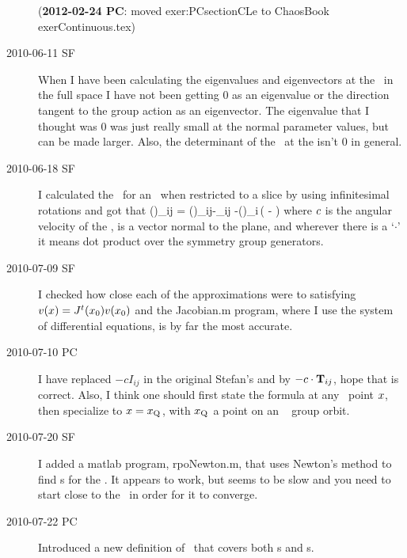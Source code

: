 \begin{description}
({\bf 2012-02-24 PC}: moved {exer:PCsectionCLe} to ChaosBook
exerContinuous.tex)

\item[2010-06-11 SF] When I have been calculating the eigenvalues and
eigenvectors at the \reqv\ in the full space I have not been getting 0 as
an eigenvalue or the direction tangent to the group action as an
eigenvector. The eigenvalue that I thought was 0 was just really small at
the normal parameter values, but can be made larger. Also, the
determinant of the \stabmat\ at the {\reqv} isn't 0 in general.

\item[2010-06-18 SF]
I calculated the \stabmat\ for an \reqv\ when restricted to a slice by
using infinitesimal rotations and got that
\beq
{\MvarRed}(\sspRed)_{ij} = \Mvar(\sspRed)_{ij}-\velRel \cdot \Lg_{ij}
     -\groupTan(\sspRed)_i\,\left(
     - \velRel {}
              \right)
where $c$ is the angular velocity of the \reqv, \sliceTan{} is a
vector normal to the plane, and wherever there is a `$\cdot$' it means
dot product over the symmetry group generators.

\item[2010-07-09 SF]
I checked how close each of the approximations were to satisfying
$v(x)=J^t({x_0}) v({x_0})$ and the Jacobian.m program, where I use the
system of differential equations, is by far the most accurate.

\item[2010-07-10 PC] I have replaced $-c I_{ij}$ in
the original Stefan's
 and  by
$-c \cdot \mathbf{T}_{ij}$, hope that is correct. Also,
I think one should first state the formula at any \statesp\
point $x$, then specialize to $x = x_{\mathrm{Q}_{}}$, with
$x_{\mathrm{Q}_{}}$ a point on an \reqv\ \REQB{} group orbit.


\item[2010-07-20 SF]
I added a matlab program, rpoNewton.m, that uses Newton's
method to find \rpo s for the \cLe. It appears to work, but
seems to be slow and you need to start close to the \rpo\ in
order for it to converge.


\item[2010-07-22 PC]
Introduced a new definition  of \FloquetM\ that covers
both \po s and \rpo s.


\end{description}
